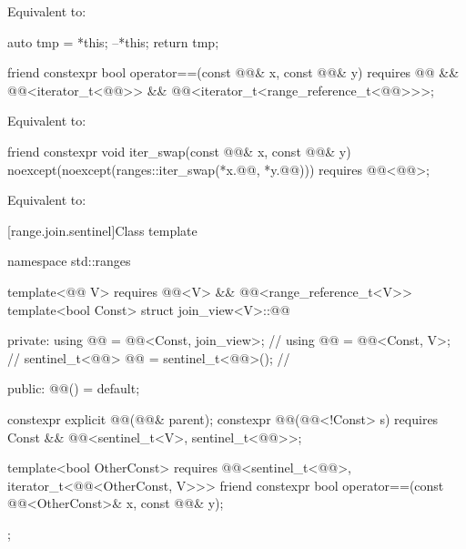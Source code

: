 \begin{itemdescr}
\pnum
\effects
Equivalent to:
\begin{codeblock}
auto tmp = *this;
--*this;
return tmp;
\end{codeblock}
\end{itemdescr}

%
\begin{itemdecl}
friend constexpr bool operator==(const @@& x, const @@& y)
  requires @@ && @@<iterator_t<@@>> &&
           @@<iterator_t<range_reference_t<@@>>>;
\end{itemdecl}

\begin{itemdescr}
\pnum
\effects
Equivalent to:
\end{itemdescr}

%
\begin{itemdecl}
friend constexpr void iter_swap(const @@& x, const @@& y)
  noexcept(noexcept(ranges::iter_swap(*x.@@, *y.@@)))
  requires @@<@@>;
\end{itemdecl}

\begin{itemdescr}
\pnum
\effects
Equivalent to: 
\end{itemdescr}

[range.join.sentinel]{Class template }

\begin{codeblock}
namespace std::ranges {
  template<@@ V>
    requires @@<V> && @@<range_reference_t<V>>
  template<bool Const>
  struct join_view<V>::@@ {
  private:
    using @@ = @@<Const, join_view>;       // \expos
    using @@ = @@<Const, V>;                 // \expos
    sentinel_t<@@> @@ = sentinel_t<@@>();         // \expos

  public:
    @@() = default;

    constexpr explicit @@(@@& parent);
    constexpr @@(@@<!Const> s)
      requires Const && @@<sentinel_t<V>, sentinel_t<@@>>;

    template<bool OtherConst>
      requires @@<sentinel_t<@@>, iterator_t<@@<OtherConst, V>>>
    friend constexpr bool operator==(const @@<OtherConst>& x, const @@& y);
  };
}
\end{codeblock}

